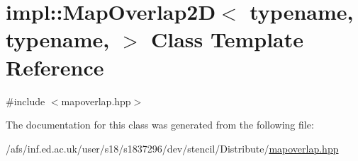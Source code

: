 \hypertarget{classimpl_1_1MapOverlap2D}{\section{impl\-:\-:Map\-Overlap2\-D$<$ typename, typename, $>$ Class Template Reference}
\label{classimpl_1_1MapOverlap2D}
}


{\ttfamily \#include $<$mapoverlap.\-hpp$>$}



The documentation for this class was generated from the following file\-:\begin{DoxyCompactItemize}
\item 
/afs/inf.\-ed.\-ac.\-uk/user/s18/s1837296/dev/stencil/\-Distribute/\hyperlink{mapoverlap_8hpp}{mapoverlap.\-hpp}\end{DoxyCompactItemize}

